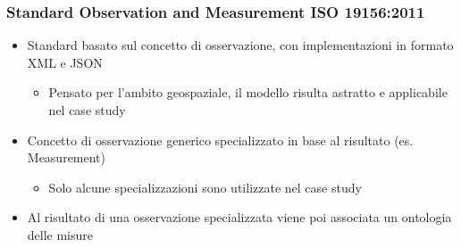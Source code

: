 \documentclass{beamer}
\begin{document}



\begin{frame}
\frametitle{Standard Observation and Measurement ISO 19156:2011}
\begin{itemize}
\item Standard basato sul concetto di osservazione, con implementazioni in formato XML e JSON
\begin{itemize}
\item Pensato per l'ambito geospaziale, il modello risulta astratto e applicabile nel case study
\end{itemize}
\item Concetto di osservazione generico specializzato in base al risultato (es. Measurement)
\begin{itemize}
\item Solo alcune specializzazioni sono utilizzate nel case study
\end{itemize}
\item Al risultato di una osservazione specializzata viene poi associata un ontologia delle misure
\end{itemize}	
\end{frame}




\end{document}
